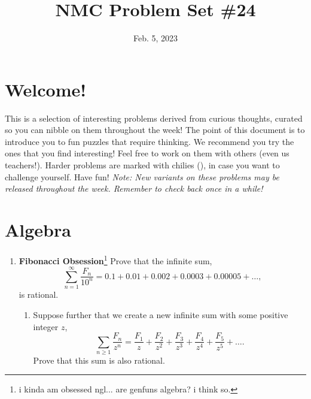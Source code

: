 \documentclass[11pt]{scrartcl}
\begin{document}
\title{NMC Problem Set \#24} %
\date{Feb. 5, 2023} %
\maketitle

\section*{Welcome!}

This is a selection of interesting problems derived from curious thoughts, curated so you can nibble on them throughout the week! The point of this document is to introduce you to fun puzzles that require thinking. We recommend you try the ones that you find interesting! Feel free to work on them with others (even us teachers!). Harder problems are marked with chilies (\fullchili), in case you want to challenge yourself.
\newline\newline
Have fun! \textit{Note: New variants on these problems may be released throughout the week. Remember to check back once in a while!}
    
\section{Algebra}
\begin{enumerate}[label=\textbf{A\arabic*}.]
    \item \textbf{Fibonacci Obsession}\footnote{i kinda am obsessed ngl... are genfuns algebra? i think so.} \newline
    Prove that the infinite sum,
    \[ \sum_{n = 1}^{\infty} \frac{F_n}{10^n} = 0.1 + 0.01 + 0.002 + 0.0003 + 0.00005 + \dots, \]
    is rational.

    \begin{enumerate}
        \item Suppose further that we create a new infinite sum with some positive integer $z$,
        \[ \sum_{n \geq 1} \frac{F_n}{z^n} = \frac{F_1}{z} + \frac{F_2}{z^2} + \frac{F_3}{z^3} + \frac{F_4}{z^4} + \frac{F_5}{z^5} + \dots.\]
        Prove that this sum is also rational.
    \end{enumerate}
    
\end{enumerate}

\newpage
\end{document}
